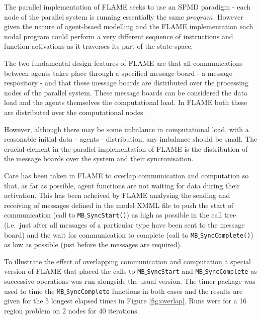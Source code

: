 The parallel implementation of FLAME seeks to use an SPMD paradigm - each node of the parallel system is running essentially the same $program$. However given the nature of agent-bsaed modelling and the FLAME implementation each nodal program could perform a very different sequence of instructions and function activations as it traverses its part of the state space. 

The two fundamental design features of FLAME are that all communications between agents takes place through a specified message board - a message respository - and that these message boards are distributed over the processing nodes of the parallel system. These message boards can be considered the data load and the agents themselves the computational load. In FLAME both these are distributed over the computational nodes.

However, although there may be some imbalance in computational load, with a reasonable initial data - agents - distribution, any imbalance should be small. The crucial element in the parallel implementation of FLAME is the distribution of the message boards over the system and their syncronisation.

Care has been taken in FLAME to overlap communication and computation so that, as far as possible, agent functions are not waiting for data during their activation. This has been acheived by FLAME analysing the sending and receiving of messages defined in the model XMML file to push the start of communication (call to \texttt{MB$\_$SyncStart()}) as high as possible in the call tree (i.e.\ just after all messages of a particular type have been sent to the message board) and the wait for communication to complete (call to \texttt{MB$\_$SyncComplete()}) as low as possible (just before the messages are required).

To illustrate the effect of overlapping communication and computation a special version of FLAME that placed the calls to  \texttt{MB$\_$SyncStart} and \texttt{MB$\_$SyncComplete} as successive operations was run alongside the usual version. The timer package was used to time the \texttt{MB$\_$SyncComplete} functions in both cases and the results are given for the 5 longest elapsed times in Figure \ref{fig:overlap}. Runs were for a 16 region problem on 2 nodes for 40 iterations. 

